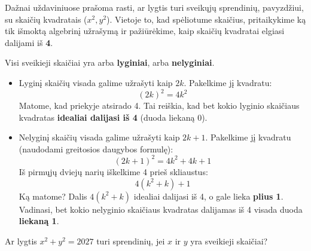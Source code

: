 \documentclass[11pt,a4paper]{scrartcl}
\begin{document}
Dažnai uždaviniuose prašoma rasti, ar lygtis turi sveikųjų sprendinių, pavyzdžiui, su skaičių kvadratais ($x^2, y^2$). Vietoje to, kad spėliotume skaičius, pritaikykime ką tik išmoktą algebrinį užrašymą ir pažiūrėkime, kaip skaičių kvadratai elgiasi dalijami iš \textbf{4}.

Visi sveikieji skaičiai yra arba \textbf{lyginiai}, arba \textbf{nelyginiai}. 
\begin{itemize}
    \item Lyginį skaičių visada galime užrašyti kaip $2k$. Pakelkime jį kvadratu: 
    \[ (2k)^2 = 4k^2 \]
    Matome, kad priekyje atsirado 4. Tai reiškia, kad bet kokio lyginio skaičiaus kvadratas \textbf{idealiai dalijasi iš 4} (duoda liekaną $0$).
    
    \item Nelyginį skaičių visada galime užrašyti kaip $2k+1$. Pakelkime jį kvadratu (naudodami greitosios daugybos formulę):
    \[ (2k+1)^2 = 4k^2 + 4k + 1 \]
    Iš pirmųjų dviejų narių iškelkime 4 prieš skliaustus:
    \[ 4(k^2 + k) + 1 \]
    Ką matome? Dalis $4(k^2+k)$ idealiai dalijasi iš 4, o gale lieka \textbf{plius 1}. Vadinasi, bet kokio nelyginio skaičiaus kvadratas dalijamas iš 4 visada duoda \textbf{liekaną 1}.
\end{itemize}

\begin{center}
\end{center}

\begin{example}
Ar lygtis $x^2 + y^2 = 2027$ turi sprendinių, jei $x$ ir $y$ yra sveikieji skaičiai?
\end{example}
\end{document}
